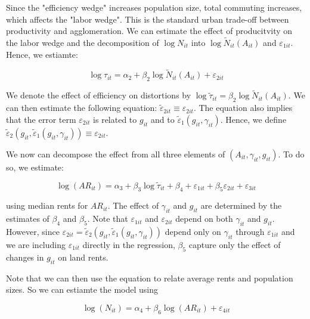 Since the "efficiency wedge" increases population size, total commuting increases, which affects the "labor wedge". This is the standard urban trade-off between productivity and agglomeration. We can estimate the effect of producitvity on the labor wedge and the decomposition of $\log N_{it}$ into $\log \tilde{N}_{it}(A_{it})$ and $\varepsilon_{1it}$. Hence, we estiamte:

\begin{equation}
    \log \tau_{it} = \alpha_2 + \beta_2 \log \tilde{N}_{it}(A_{it}) + \varepsilon_{2it}
\end{equation}

We denote the effect of efficiency on distortions by $\log \tilde{\tau}_{it} = \beta_2 \log \tilde{N}_{it}(A_{it})$. We can then estimate the following equation: $\tilde{\varepsilon}_{2it} \equiv \varepsilon_{2it}$. The equation also implies that the error term $\varepsilon_{2it}$ is related to $g_{it}$ and to $\tilde{\varepsilon}_{1}(g_{it}, \gamma_{it})$. Hence, we define $\tilde{\varepsilon}_{2}(g_{it}, \tilde{\varepsilon}_{1}(g_{it}, \gamma_{it})) \equiv \varepsilon_{2it}$.

We now can decompose the effect from all three elements of $(A_{it}, \gamma_{it}, g_{it})$. To do so, we estimate:

\begin{equation}
    \log (AR_{it}) = \alpha_3 + \beta_3 \log \tilde{\tau}_{it} + \beta_4 + \varepsilon_{1it} + \beta_5 \varepsilon_{2it} + \varepsilon_{3it}
\end{equation}

using median rents for $AR_{it}$. The effect of $\gamma_{it}$ and $g_{it}$ are determined by the estimates of $\beta_4$ and $\beta_5$. Note that $\varepsilon_{1it}$ and $\varepsilon_{2it}$ depend on both $\gamma_{it}$ and $g_{it}$. However, since $\varepsilon_{2it} = \tilde{\varepsilon}_{2}(g_{it}, \tilde{\varepsilon}_{1}(g_{it}, \gamma_{it}))$ depend only on $\gamma_{it}$ through $\varepsilon_{1it}$ and we are including $\varepsilon_{1it}$ directly in the regression, $\beta_5$ capture only the effect of changes in $g_{it}$ on land rents.

Note that we can then use the equation to relate average rents and population sizes. So we can estiamte the model using 

\begin{equation}
    \log (N_{it}) = \alpha_4 + \beta_6 \log (AR_{it}) + \varepsilon_{4it}
\end{equation}

